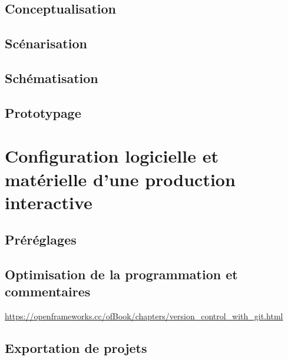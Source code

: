 \documentclass[
  french,
]{book}
\begin{document}
\hypertarget{conceptualisation}{%
\subsection{Conceptualisation}\label{conceptualisation}}

\hypertarget{scuxe9narisation}{%
\subsection{Scénarisation}\label{scuxe9narisation}}

\hypertarget{schuxe9matisation}{%
\subsection{Schématisation}\label{schuxe9matisation}}

\hypertarget{prototypage}{%
\subsection{Prototypage}\label{prototypage}}

\hypertarget{configuration-logicielle-et-matuxe9rielle-dune-production-interactive}{%
\section{Configuration logicielle et matérielle d'une production interactive}\label{configuration-logicielle-et-matuxe9rielle-dune-production-interactive}}

\hypertarget{pruxe9ruxe9glages}{%
\subsection{Préréglages}\label{pruxe9ruxe9glages}}

\hypertarget{optimisation-de-la-programmation-et-commentaires}{%
\subsection{Optimisation de la programmation et commentaires}\label{optimisation-de-la-programmation-et-commentaires}}

\url{https://openframeworks.cc/ofBook/chapters/version_control_with_git.html}

\hypertarget{exportation-de-projets}{%
\subsection{Exportation de projets}\label{exportation-de-projets}}
\end{document}
